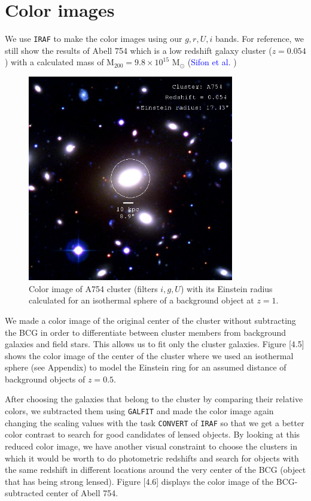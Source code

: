 \section{Color images} 

We use \texttt{IRAF} to make the color images using our $g,r,U,i$ bands. For reference, we still show the results of Abell 754 which is a low redshift galaxy  cluster ($z=0.054$) with a calculated mass of $\text{M}_{200}=9.8\times 10^{15}$ $\text{M}_{\odot}$ (\textcolor{blue}{Sifon et al.} \citeyear{Reference9})

\begin{figure}[H]
\centering
\includegraphics[width=9cm]{images/cA754.jpg}
\caption[Color image of A754]{Color image of A754 cluster (filters $i,g,U$) with its Einstein radius calculated for an isothermal sphere of a background object at $z=1$.}
\end{figure}

We made a color image of the original center of the cluster without subtracting the BCG in order to differentiate between cluster members from background galaxies and field stars. This allows us to fit only the cluster galaxies. Figure [4.5] shows the color image of the center of the cluster where we used an isothermal sphere (see Appendix) to model the Einstein ring for an assumed distance of background objects of $z=0.5$. 

After choosing the galaxies that belong to the cluster by comparing their relative colors, we subtracted them using \texttt{GALFIT} and made the color image again changing the scaling values with the task \texttt{CONVERT} of \texttt{IRAF} so that we get a better color contrast to search for good candidates of lensed objects. By looking at this reduced color image, we have another visual constraint to choose the clusters in which it would be worth to do photometric redshifts and search for objects with the same redshift in different locations around the very center of the BCG (object that has being strong lensed). Figure [4.6] displays the color image of the BCG-subtracted center of Abell 754.

